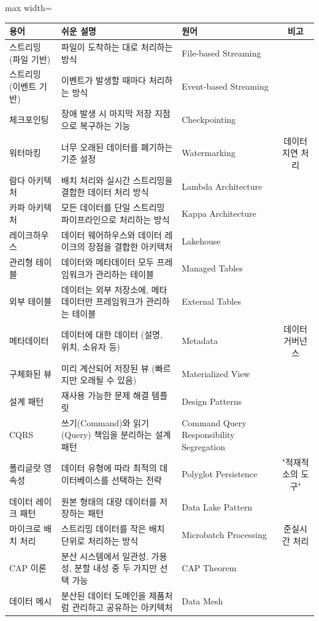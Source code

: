 \documentclass[11pt,a4paper]{article}
\begin{document}
\begin{adjustbox}{max width=\textwidth}
\begin{tabular}{lllc}
\toprule
\textbf{용어} & \textbf{쉬운 설명} & \textbf{원어} & \textbf{비고} \\
\midrule
스트리밍 (파일 기반) & 파일이 도착하는 대로 처리하는 방식 & File-based Streaming & \\
스트리밍 (이벤트 기반) & 이벤트가 발생할 때마다 처리하는 방식 & Event-based Streaming & \\
체크포인팅 & 장애 발생 시 마지막 저장 지점으로 복구하는 기능 & Checkpointing & \\
워터마킹 & 너무 오래된 데이터를 폐기하는 기준 설정 & Watermarking & 데이터 지연 처리 \\
람다 아키텍처 & 배치 처리와 실시간 스트리밍을 결합한 데이터 처리 방식 & Lambda Architecture & \\
카파 아키텍처 & 모든 데이터를 단일 스트리밍 파이프라인으로 처리하는 방식 & Kappa Architecture & \\
레이크하우스 & 데이터 웨어하우스와 데이터 레이크의 장점을 결합한 아키텍처 & Lakehouse & \\
관리형 테이블 & 데이터와 메타데이터 모두 프레임워크가 관리하는 테이블 & Managed Tables & \\
외부 테이블 & 데이터는 외부 저장소에, 메타데이터만 프레임워크가 관리하는 테이블 & External Tables & \\
메타데이터 & 데이터에 대한 데이터 (설명, 위치, 소유자 등) & Metadata & 데이터 거버넌스 \\
구체화된 뷰 & 미리 계산되어 저장된 뷰 (빠르지만 오래될 수 있음) & Materialized View & \\
설계 패턴 & 재사용 가능한 문제 해결 템플릿 & Design Patterns & \\
CQRS & 쓰기(Command)와 읽기(Query) 책임을 분리하는 설계 패턴 & Command Query Responsibility Segregation & \\
폴리글랏 영속성 & 데이터 유형에 따라 최적의 데이터베이스를 선택하는 전략 & Polyglot Persistence & "적재적소의 도구" \\
데이터 레이크 패턴 & 원본 형태의 대량 데이터를 저장하는 패턴 & Data Lake Pattern & \\
마이크로 배치 처리 & 스트리밍 데이터를 작은 배치 단위로 처리하는 방식 & Microbatch Processing & 준실시간 처리 \\
CAP 이론 & 분산 시스템에서 일관성, 가용성, 분할 내성 중 두 가지만 선택 가능 & CAP Theorem & \\
데이터 메시 & 분산된 데이터 도메인을 제품처럼 관리하고 공유하는 아키텍처 & Data Mesh & \\

\end{tabular}
\end{adjustbox}
\end{document}
